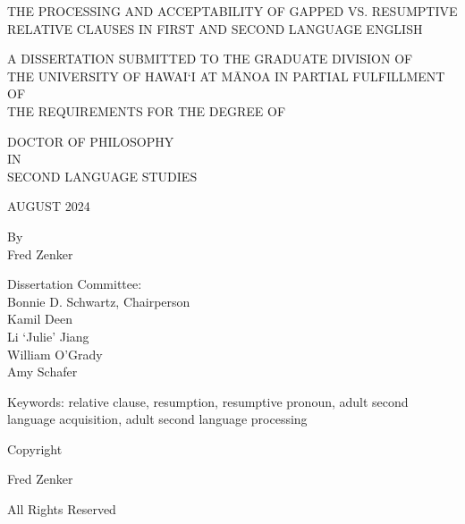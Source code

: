 
\centering
\vspace{3cm}

\doublespacing
THE PROCESSING AND ACCEPTABILITY OF GAPPED VS. RESUMPTIVE \\
RELATIVE CLAUSES IN FIRST AND SECOND LANGUAGE ENGLISH

\vspace{1.5cm}
\singlespacing
A DISSERTATION SUBMITTED TO THE GRADUATE DIVISION OF \\
THE UNIVERSITY OF HAWAI`I AT MĀNOA IN PARTIAL FULFILLMENT OF \\
THE REQUIREMENTS FOR THE DEGREE OF

\vspace{1cm}
\doublespacing
DOCTOR OF PHILOSOPHY \\
IN \\
SECOND LANGUAGE STUDIES

\vspace{1.5cm}
\singlespacing
AUGUST 2024

\vspace{1.5cm}
\doublespacing
By \\
Fred Zenker

\vspace{1.5 cm}
\singlespacing
Dissertation Committee: \\
Bonnie D. Schwartz, Chairperson \\
Kamil Deen \\
Li `Julie' Jiang \\
William O'Grady \\
Amy Schafer

\vspace*{\fill}
\flushleft
Keywords: relative clause, resumption, resumptive pronoun, adult second language acquisition, adult second language processing

\newpage

\setcounter{page}{2}
\vspace*{\fill}
\begin{centering}

Copyright \textcopyright {}

\vspace{0.5 cm}

Fred Zenker

All Rights Reserved

\end{centering}

